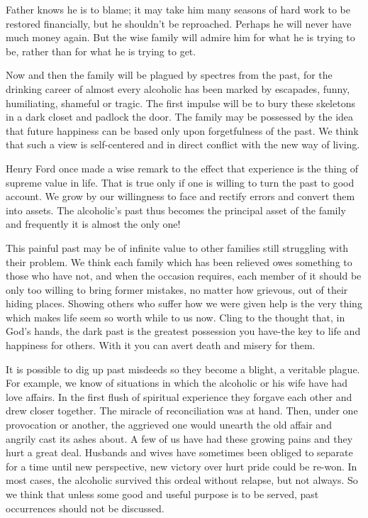 \begin{biblechapter}
Father knows he is to blame; it may take him many seasons of hard work to be restored financially, but he shouldn't be reproached.  Perhaps he will never have much money again.  But the wise family will admire him for what he is trying to be, rather than for what he is trying to get.

Now and then the family will be plagued by spectres from the past, for the drinking career of almost every alcoholic has been marked by escapades, funny, humiliating, shameful or tragic.  The first impulse will be to bury these skeletons in a dark closet and padlock the door.  The family may be possessed by the idea that future happiness can be based only upon forgetfulness of the past.  We think that such a view is self-centered and in direct conflict with the new way of living.

Henry Ford once made a wise remark to the effect that experience is the thing of supreme value in life.  That is true only if one is willing to turn the past to good account.  We grow by our willingness to face and rectify errors and convert them into assets.  The alcoholic's past thus becomes the principal asset of the family and frequently it is almost the only one!

This painful past may be of infinite value to other families still struggling with their problem.  We think each family which has been relieved owes something to those who have not, and when the occasion requires, each member of it should be only too willing to bring former mistakes, no matter how grievous, out of their hiding places.  Showing others who suffer how we were given help is the very thing which makes life seem so worth while to us now.  Cling to the thought that, in God's hands, the dark past is the greatest possession you have-the key to life and happiness for others.  With it you can avert death and misery for them.

It is possible to dig up past misdeeds so they become a blight, a veritable plague.  For example, we know of situations in which the alcoholic or his wife have had love affairs.  In the first flush of spiritual experience they forgave each other and drew closer together.  The miracle of reconciliation was at hand.  Then, under one provocation or another, the aggrieved one would unearth the old affair and angrily cast its ashes about.  A few of us have had these growing pains and they hurt a great deal.  Husbands and wives have sometimes been obliged to separate for a time until new perspective, new victory over hurt pride could be re-won.  In most cases, the alcoholic survived this ordeal without relapse, but not always.  So we think that unless some good and useful purpose is to be served, past occurrences should not be discussed.


\end{biblechapter}
